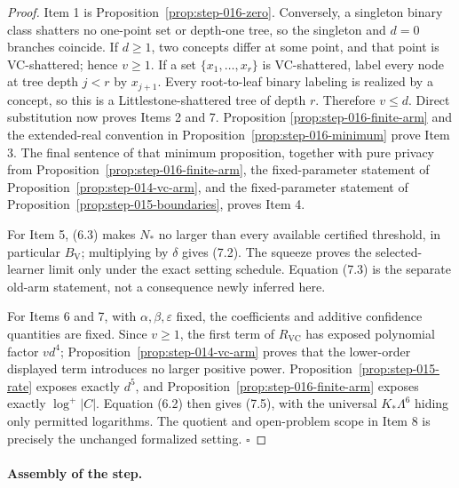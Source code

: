\begin{proof}
Item 1 is Proposition~\ref{prop:step-016-zero}. Conversely, a
singleton binary class shatters no one-point set or depth-one tree, so the
singleton and \(d=0\) branches coincide. If \(d\ge1\), two concepts differ
at some point, and that point is VC-shattered; hence \(v\ge1\). If a set
\(\{x_1,\ldots,x_r\}\) is VC-shattered, label every node at tree depth
\(j<r\) by \(x_{j+1}\). Every root-to-leaf binary labeling is realized by
a concept, so this is a Littlestone-shattered tree of depth \(r\). Therefore
\(v\le d\). Direct substitution now proves Items 2 and 7. Proposition
\ref{prop:step-016-finite-arm} and the extended-real convention in
Proposition~\ref{prop:step-016-minimum} prove Item 3. The final sentence of
that minimum proposition, together with pure privacy from
Proposition~\ref{prop:step-016-finite-arm}, the fixed-parameter statement of
Proposition~\ref{prop:step-014-vc-arm}, and the fixed-parameter
statement of Proposition~\ref{prop:step-015-boundaries}, proves
Item 4.

For Item 5, (6.3) makes \(N_*\) no larger than every available certified
threshold, in particular \(B_{\mathrm V}\); multiplying by \(\delta\) gives
(7.2). The squeeze proves the selected-learner limit only under the exact
setting schedule. Equation (7.3) is the separate  old-arm statement,
not a consequence newly inferred here.

For Items 6 and 7, with \(\alpha,\beta,\varepsilon\) fixed, the coefficients
and additive confidence quantities are fixed. Since \(v\ge1\), the first
term of \(R_{\mathrm{VC}}\) has exposed polynomial factor \(vd^4\); Proposition~\ref{prop:step-014-vc-arm} proves that the lower-order displayed
term introduces no larger positive power. Proposition~\ref{prop:step-015-rate} exposes exactly \(d^5\), and
Proposition~\ref{prop:step-016-finite-arm} exposes exactly
\(\log^+|C|\). Equation (6.2) then gives (7.5), with the universal
\(K_*\Lambda^6\) hiding only permitted logarithms. The quotient and
open-problem scope in Item 8 is precisely the unchanged formalized setting.
\(\square\)


\end{proof}

\paragraph{Assembly of the step.}


